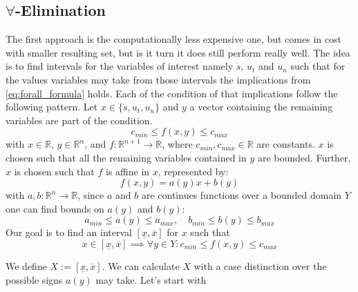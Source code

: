 \subsection{\texorpdfstring{$\forall$}{For all}-Elimination}

The first approach is the computationally less expensive one, but comes in cost with smaller resulting set, but is it turn it does still perform
really well.
The idea is to find intervals for the variables of interest namely $\dot{s}$, $u_t$ and $u_n$ such that for the values variables may take from those
intervals the implications from \ref{eq:forall_formula} holds.
Each of the condition of that implications follow the following pattern.
Let $x \in \{\dot{s}, u_t, u_n\}$ and $y$ a vector containing the remaining variables are part of the condition.
\begin{equation}
	\label{eq:cur_condition}
	c_{min} \leq f(x, y) \leq c_{max}
\end{equation}
with $x \in \mathbb{R}$, $y \in \mathbb{R}^n$, and $f: \mathbb{R}^{n+1} \to \mathbb{R}$, where $c_{min}, c_{max} \in \mathbb{R}$ are constants.
$x$ is chosen such that all the remaining variables contained in $y$ are bounded.
Further, $x$ is chosen such that $f$ is affine in $x$, represented by:
\begin{equation}
	f(x, y) = a(y) x + b(y)
\end{equation}
with $a, b : \mathbb{R}^n \to \mathbb{R}$, since $a$ and $b$ are continues functions over a bounded domain $Y$ one can find bounds on $a(y)$ and $b(y)$:
\begin{equation}
	a_{min} \leq a(y) \leq a_{max}, \quad b_{min} \leq b(y) \leq b_{max}
\end{equation}
Our goal is to find an interval $[\underline{x}, \overline{x}]$ for $x$ such that
\begin{equation}
	x\in [\underline{x}, \overline{x}] \implies \forall y\in Y: c_{min} \leq f(x, y) \leq c_{max}
\end{equation}

We define $X := [\underline{x}, \overline{x}]$.
We can calculate $X$ with a case distinction over the possible signs $a(y)$ may take.
Let's start with

